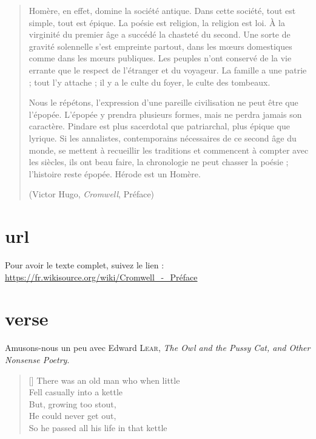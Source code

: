\documentclass{article}
\begin{document}
\begin{quotation}
Homère, en effet, domine la société antique. Dans cette société,
tout est simple, tout est épique. La poésie est religion, la
religion est loi. À la virginité du premier âge a succédé la
chasteté du second. Une sorte de gravité solennelle s'est
empreinte partout, dans les mœurs domestiques comme dans les
mœurs publiques. Les peuples n'ont conservé de la vie errante
que le respect de l'étranger et du voyageur. La famille a une
patrie ; tout l'y attache ; il y a le culte du foyer, le culte
des tombeaux.

Nous le répétons, l'expression d'une pareille civilisation ne
peut être que l'épopée. L'épopée y prendra plusieurs formes,
mais ne perdra jamais son caractère. Pindare est plus sacerdotal
que patriarchal, plus épique que lyrique. Si les annalistes,
contemporains nécessaires de ce second âge du monde, se mettent
à recueillir les traditions et commencent à compter avec les
siècles, ils ont beau faire, la chronologie ne peut chasser la
poésie ; l'histoire reste épopée. Hérode est un Homère.

\raggedleft(Victor Hugo, \emph{Cromwell}, Préface)
\end{quotation}


\section{url}


Pour avoir le texte complet, suivez le lien :
\url{https://fr.wikisource.org/wiki/Cromwell_-_Préface}



\section{verse}


Amusons-nous un peu avec Edward \textsc{Lear},
\emph{The Owl and the Pussy Cat, and Other Nonsense Poetry}.

\settowidth{}
\begin{verse}[\versewidth]
There was an old man who when little \\
Fell casually into a kettle \\
\> But, growing too stout, \\
\> He could never get out, \\
So he passed all his life in that kettle
\end{verse}
\end{document}
